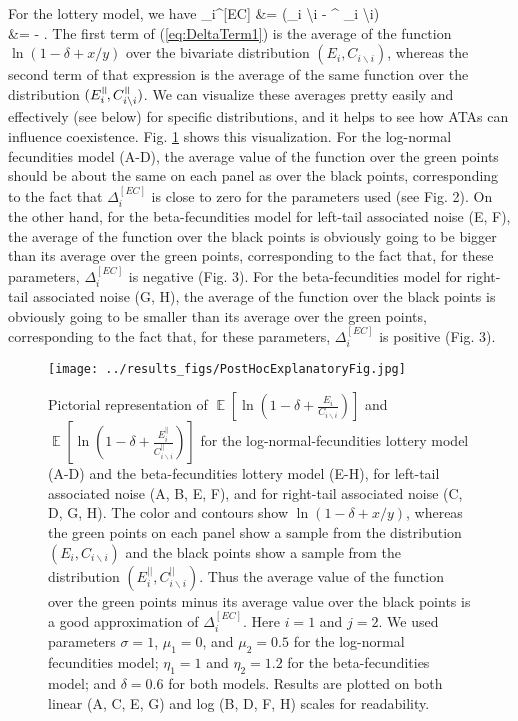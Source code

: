 \documentclass[letterpaper,11pt]{article}
\DeclareMathOperator{\E}{\mathbb{E}}%
\newcommand{\nat}{%
\text{\hspace{-1.5pt}
\begin{tikzpicture}[scale=1.8]%
\draw (.333ex,0) -- (.333ex,1ex);%
\draw (.666ex,0) -- (.666ex,1ex);
\end{tikzpicture}%
}}
\newcommand{\olr}{\overline{r}}
\newcommand{\olrn}{\overline{r}^{\nat}}
\newcommand{\bs}{\backslash}
\let\oldalign\align
\let\oldendalign\endalign
\renewenvironment{align}
  {\linenomathNonumbers\oldalign}
  {\oldendalign\endlinenomath}
\begin{document}
For the lottery model, we have 
\begin{align}
\Delta_i^{[EC]} &= (\olr_{i \bs i} - \olrn_{i \bs i}) \\
&= \E \left[ \ln \left( 1-\delta+\frac{E_i}{C_{i \bs i}} \right) \right] - \E \left[ \ln \left( 1-\delta+\frac{E_i^\nat}{C_{i \bs i}^\nat} \right) \right]. \label{eq:DeltaTerm1} 
\end{align}
The first term of (\ref{eq:DeltaTerm1}) is the average of the function $\ln(1-\delta+x/y)$ over the bivariate 
distribution $(E_i,C_{i \bs i})$, whereas the second term of that expression is the average of the same
function over the distribution $(E_i^\nat,C_{i \bs i}^\nat)$. We can visualize these averages pretty easily and 
effectively (see below) for specific distributions, and it helps to see how ATAs can influence coexistence.
Fig. \ref{thefig} shows this visualization. For the log-normal fecundities model (A-D), the average value of the 
function over the green points should be about the same on each panel as over the black points, 
corresponding to the fact that $\Delta_i^{[EC]}$ is close to zero for the parameters used (see Fig. 2). 
On the other hand, for the beta-fecundities model for left-tail associated noise (E, F), the average of the function 
over the black points is obviously going to be bigger than its average over the green points, corresponding to the 
fact that, for these parameters, $\Delta_i^{[EC]}$ is negative (Fig. 3).
For the beta-fecundities model for right-tail associated noise (G, H), the average of the function 
over the black points is obviously going to be smaller than its average over the green points, corresponding to the 
fact that, for these parameters, $\Delta_i^{[EC]}$ is positive (Fig. 3).

\begin{figure}
\texttt{[image: ../results\_figs/PostHocExplanatoryFig.jpg]}
\caption{Pictorial representation of $\E \left[ \ln \left( 1-\delta+\frac{E_i}{C_{i \bs i}} \right) \right]$ and 
$\E \left[ \ln \left( 1-\delta+\frac{E_i^{||}}{C_{i \bs i}^{||}} \right) \right]$ for the 
log-normal-fecundities lottery model (A-D) and the beta-fecundities lottery model (E-H),
for left-tail associated noise (A, B, E, F), and for right-tail associated noise (C, D, G, H).
The color and contours show $\ln(1-\delta+x/y)$, whereas the green points on each panel show a sample from
the distribution $(E_i,C_{i \bs i})$ and the black points show a sample from the distribution 
$(E_i^{||},C_{i \bs i}^{||})$. Thus the average value of the function over the green points minus its
average value over the black points is a good approximation of $\Delta_i^{[EC]}$. Here $i=1$ and
$j=2$. We used parameters $\sigma=1$, $\mu_1 = 0$, and $\mu_2 = 0.5$ for the log-normal fecundities
model; $\eta_1 = 1$ and $\eta_2 = 1.2$ for the beta-fecundities model; and $\delta=0.6$
for both models. Results are plotted on both linear (A, C, E, G) and log (B, D, F, H) 
scales for readability.}\label{thefig}
\end{figure}
\end{document}
